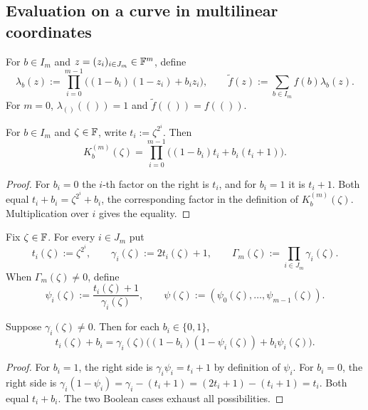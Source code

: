 \subsection{Evaluation on a curve in multilinear coordinates}\label{sec:kbalgebra:evaluation}

\begin{definition}\label{def:kbalgebra:eq}
For $b\in I_m$ and $z=(z_i)_{i\in J_m}\in\mathbb{F}^m$, define
\[
 \lambda_b(z):=\prod_{i=0}^{m-1}\bigl((1-b_i)(1-z_i)+b_i z_i\bigr),
 \qquad \widetilde f(z):=\sum_{b\in I_m}f(b)\lambda_b(z).
\]
For $m=0$, $\lambda_{()}(())=1$ and $\widetilde f(())=f(())$.
\end{definition}

\begin{lemma}\label{lem:kbalgebra:point-eval}
For $b\in I_m$ and $\zeta\in\mathbb{F}$, write $t_i:=\zeta^{2^i}$. Then
\begin{equation}\label{eq:kbalgebra:point-eval}
 K_b^{(m)}(\zeta)=\prod_{i=0}^{m-1}
 \bigl((1-b_i)t_i+b_i(t_i+1)\bigr).
\end{equation}
\end{lemma}
\begin{proof}
For $b_i=0$ the $i$-th factor on the right is $t_i$, and for $b_i=1$ it is $t_i+1$. Both equal $t_i+b_i=\zeta^{2^i}+b_i$, the corresponding factor in the definition of $K_b^{(m)}(\zeta)$. Multiplication over $i$ gives the equality.
\end{proof}

\begin{definition}\label{def:kbalgebra:curve}
Fix $\zeta\in\mathbb{F}$. For every $i\in J_m$ put
\[
 t_i(\zeta):=\zeta^{2^i},\qquad
 \gamma_i(\zeta):=2t_i(\zeta)+1,
 \qquad \Gamma_m(\zeta):=\prod_{i\in J_m}\gamma_i(\zeta).
\]
When $\Gamma_m(\zeta)\neq0$, define
\[
 \psi_i(\zeta):=\frac{t_i(\zeta)+1}{\gamma_i(\zeta)},
 \qquad\psi(\zeta):=(\psi_0(\zeta),\ldots,\psi_{m-1}(\zeta)).
\]
\end{definition}

\begin{lemma}\label{lem:kbalgebra:one-factor-eval}
Suppose $\gamma_i(\zeta)\neq0$. Then for each $b_i\in\{0,1\}$,
\[
 t_i(\zeta)+b_i
 =\gamma_i(\zeta)\bigl((1-b_i)(1-\psi_i(\zeta))+b_i\psi_i(\zeta)\bigr).
\]
\end{lemma}
\begin{proof}
For $b_i=1$, the right side is $\gamma_i\psi_i=t_i+1$ by definition of $\psi_i$. For $b_i=0$, the right side is $\gamma_i(1-\psi_i)=\gamma_i-(t_i+1)=(2t_i+1)-(t_i+1)=t_i$. Both equal $t_i+b_i$. The two Boolean cases exhaust all possibilities.
\end{proof}

